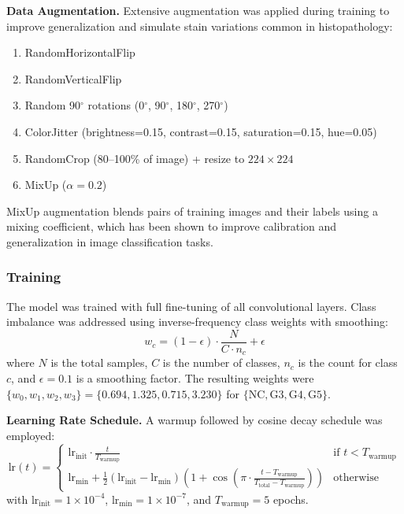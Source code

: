 \documentclass[conference]{IEEEtran}
\begin{document}
\textbf{Data Augmentation.}
Extensive augmentation was applied during training to improve generalization and simulate stain variations common in histopathology:
\begin{enumerate}
    \item RandomHorizontalFlip
    \item RandomVerticalFlip
    \item Random 90$^\circ$ rotations (0$^\circ$, 90$^\circ$, 180$^\circ$, 270$^\circ$)
    \item ColorJitter (brightness=0.15, contrast=0.15, saturation=0.15, hue=0.05)
    \item RandomCrop (80--100\% of image) + resize to $224 \times 224$
    \item MixUp ($\alpha=0.2$)
\end{enumerate}
MixUp augmentation blends pairs of training images and their labels using a mixing coefficient, which has been shown to improve calibration and generalization in image classification tasks.

\subsubsection{\textbf{Training}}
The model was trained with full fine-tuning of all convolutional layers. Class imbalance was addressed using inverse-frequency class weights with smoothing:
\[
w_c = (1 - \epsilon) \cdot \frac{N}{C \cdot n_c} + \epsilon
\]
where $N$ is the total samples, $C$ is the number of classes, $n_c$ is the count for class $c$, and $\epsilon = 0.1$ is a smoothing factor. The resulting weights were $\{w_0, w_1, w_2, w_3\} = \{0.694, 1.325, 0.715, 3.230\}$ for $\{\text{NC}, \text{G3}, \text{G4}, \text{G5}\}$.

\textbf{Learning Rate Schedule.}
A warmup followed by cosine decay schedule was employed:
\[
\text{lr}(t) =
\begin{cases}
\text{lr}_{\text{init}} \cdot \frac{t}{T_{\text{warmup}}} & \text{if } t < T_{\text{warmup}} \\[6pt]
\text{lr}_{\text{min}} + \frac{1}{2}(\text{lr}_{\text{init}} - \text{lr}_{\text{min}})\left(1 + \cos\left(\pi \cdot \frac{t - T_{\text{warmup}}}{T_{\text{total}} - T_{\text{warmup}}}\right)\right) & \text{otherwise}
\end{cases}
\]
with $\text{lr}_{\text{init}} = 1 \times 10^{-4}$, $\text{lr}_{\text{min}} = 1 \times 10^{-7}$, and $T_{\text{warmup}} = 5$ epochs.
\end{document}
